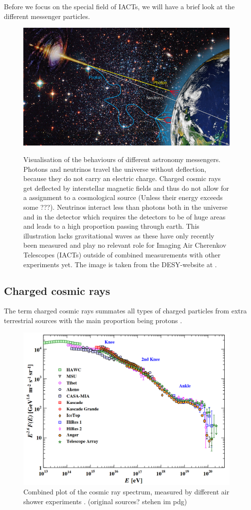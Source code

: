 Before we focus on the special field of IACTs, we will have
a brief look at the different messenger particles.

\begin{figure}
	\centering
	\includegraphics[width=.6\textwidth]{images/astro-web-titel.jpg}
	\label{fig:multi_messenger}
	\caption{Visualisation of the behaviours of different astronomy messengers.
		Photons and neutrinos 
		travel the universe without deflection, because they do not
		carry an electric charge.
		Charged cosmic rays get deflected by interstellar
		magnetic fields and thus do not allow for a assignment to a cosmological source
		(Unless their energy exceeds some ???).
		Neutrinos interact less than photons both in the universe and in the detector 
		which requires the detectors to be of huge areas and leads to a high 
		proportion passing through earth.
		This illustration lacks gravitational waves 
		as these have only recently been measured and play no relevant role 
		for Imaging Air Cherenkov Telescopes (IACTs) outside of combined 
		measurements with other experiments yet.
		The image is taken from the DESY-website at \cite{desy_mm_astro}.
	}
\end{figure}


\subsection{Charged cosmic rays}
The term charged cosmic rays summates all types of charged particles from
extra terrestrial sources with the main proportion being protons
\cite{Dembinski:2017zsh}.


\begin{figure}
	\centering
	\includegraphics[width=.6\textwidth]{images/cr_spectrum.png}
	\caption{Combined plot of the cosmic ray spectrum,
		measured by different air shower experiments \cite{pdg19}. 
		(original sources? stehen im pdg)
	}
	\label{fig:cr_spectrum}
\end{figure}

